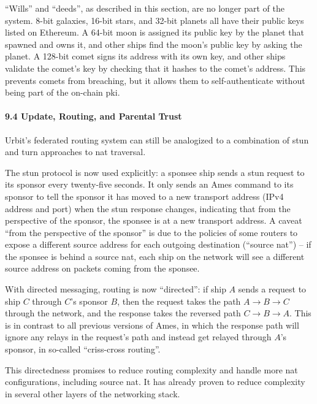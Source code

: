 \documentclass[twoside]{article}
\begin{document}
``Wills'' and ``deeds'', as described in this section, are no longer part of the system.  8-bit galaxies, 16-bit stars, and 32-bit planets all have their public keys listed on Ethereum.  A 64-bit moon is assigned its public key by the planet that spawned and owns it, and other ships find the moon's public key by asking the planet.  A 128-bit comet signs its address with its own key, and other ships validate the comet's key by checking that it hashes to the comet's address.  This prevents comets from breaching, but it allows them to self-authenticate without being part of the on-chain {\sc pki}.

\paragraph{9.4 Update, Routing, and Parental Trust}

Urbit's federated routing system can still be analogized to a combination of {\sc stun} and {\sc turn} approaches to {\sc nat} traversal.

The {\sc stun} protocol is now used explicitly: a sponsee ship sends a {\sc stun} request to its sponsor every twenty-five seconds.  It only sends an Ames command to its sponsor to tell the sponsor it has moved to a new transport address (IPv4 address and port) when the {\sc stun} response changes, indicating that from the perspective of the sponsor, the sponsee is at a new transport address.  A caveat ``from the perspective of the sponsor'' is due to the policies of some routers to expose a different source address for each outgoing destination (``source {\sc nat}'') – if the sponsee is behind a source {\sc nat}, each ship on the network will see a different source address on packets coming from the sponsee.

With directed messaging, routing is now ``directed'': if ship $A$ sends a request to ship $C$ through $C$'s sponsor $B$, then the request takes the path $A \rightarrow B \rightarrow C$ through the network, and the response takes the reversed path $C \rightarrow B \rightarrow A$.  This is in contrast to all previous versions of Ames, in which the response path will ignore any relays in the request's path and instead get relayed through $A$'s sponsor, in so-called ``criss-cross routing''.

This directedness promises to reduce routing complexity and handle more {\sc nat} configurations, including source {\sc nat}.  It has already proven to reduce complexity in several other layers of the networking stack.
\end{document}
